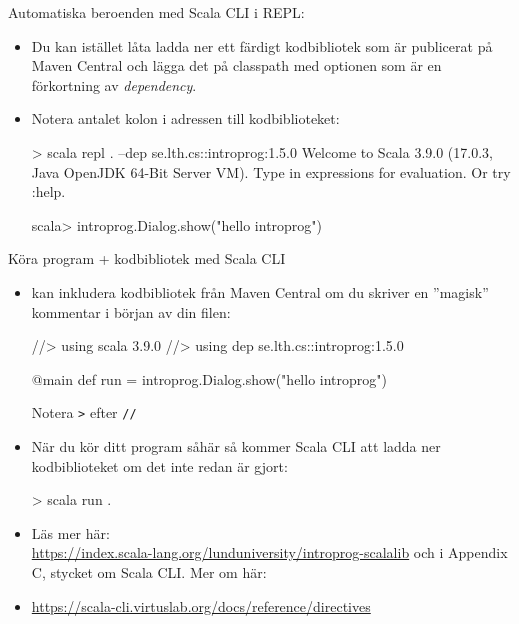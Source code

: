 \begin{Slide}{Automatiska beroenden med Scala CLI i REPL:}
\begin{itemize}\SlideFontSmall
\item Du kan istället låta   ladda ner ett färdigt kodbibliotek som är publicerat på Maven Central och lägga det på classpath med optionen  som är en förkortning av \emph{dependency}. 
\item Notera antalet kolon i adressen till kodbiblioteket:
\begin{REPLsmall}
> scala repl . --dep se.lth.cs::introprog:1.5.0
Welcome to Scala 3.9.0 (17.0.3, Java OpenJDK 64-Bit Server VM).
Type in expressions for evaluation. Or try :help.

scala> introprog.Dialog.show("hello introprog")
\end{REPLsmall}
\end{itemize}
\end{Slide}


\begin{Slide}{Köra program + kodbibliotek med Scala CLI}\SlideFontTiny
\begin{itemize}
\item {} kan inkludera kodbibliotek från Maven Central om du skriver en ''magisk'' kommentar i början av din filen:
\begin{Code}
//> using scala 3.9.0
//> using dep se.lth.cs::introprog:1.5.0

@main def run = introprog.Dialog.show("hello introprog")
\end{Code}
Notera \texttt{>} efter \texttt{//}

\item När du kör ditt program såhär så kommer Scala CLI att ladda ner kodbiblioteket om det inte redan är gjort:
\begin{REPLsmall}
> scala run .
\end{REPLsmall}
\item Läs mer här:\\\url{https://index.scala-lang.org/lunduniversity/introprog-scalalib} och i Appendix C, stycket om Scala CLI. Mer om  här:
\item[] \url{https://scala-cli.virtuslab.org/docs/reference/directives}
\end{itemize}

\end{Slide}

